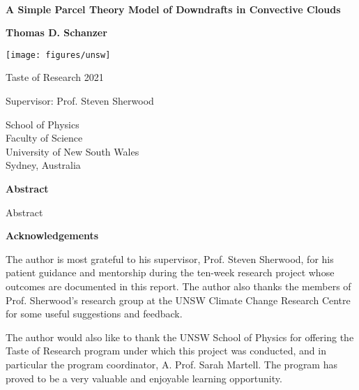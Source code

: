\documentclass[12pt,titlepage]{article}
\begin{document}
% 

\begin{titlepage}
    \begin{center}
        ~

        \vspace{3cm}
        \Huge
        \textbf{%
        	A Simple Parcel Theory Model of Downdrafts in Convective Clouds}
        
        \vspace{0.75cm}
        \Large
        \textbf{Thomas D. Schanzer}
            
        \vfill
            
        \texttt{[image: figures/unsw]}

        \vspace{1cm}

        \large    
        Taste of Research 2021

        Supervisor: Prof. Steven Sherwood

        \vspace{1cm}
            
        \large
        School of Physics\\
        Faculty of Science\\
        University of New South Wales\\
        Sydney, Australia\\
    \end{center}
\end{titlepage}

\begin{center}
	\large
	\textbf{Abstract}
\end{center}

Abstract

\begin{center}
	\large
	\textbf{Acknowledgements}
\end{center}

The author is most grateful to his supervisor, Prof. Steven Sherwood, for
his patient guidance and mentorship during the ten-week research project
whose outcomes are documented in this report. The author also thanks
the members of Prof. Sherwood's research group at the UNSW Climate
Change Research Centre for some useful suggestions and feedback.

The author would also like to thank the UNSW School of Physics for
offering the Taste of Research program under which this project was
conducted, and in particular the program coordinator, A. Prof. Sarah
Martell. The program has proved to be a very valuable and enjoyable
learning opportunity.
\end{document}
